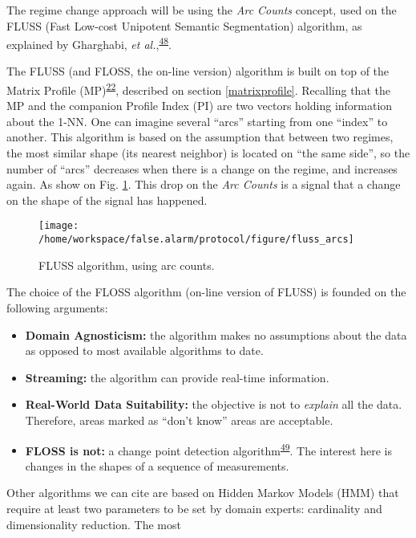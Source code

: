 \documentclass[12pt,twoside]{fmupthesis}
\providecommand{\tightlist}{%
  \setlength{\itemsep}{0pt}\setlength{\parskip}{0pt}}
\begin{document}
The regime change approach will be using the \emph{Arc Counts} concept, used on the FLUSS (Fast Low-cost
Unipotent Semantic Segmentation) algorithm, as explained by Gharghabi, \emph{et al.},\textsuperscript{\protect\hyperlink{ref-gharghabi2018}{48}}.

The FLUSS (and FLOSS, the on-line version) algorithm is built on top of the Matrix Profile
(MP)\textsuperscript{\protect\hyperlink{ref-Yeh2017a}{22}}, described on section \ref{matrixprofile}. Recalling that the MP and the companion
Profile Index (PI) are two vectors holding information about the 1-NN. One can imagine several
``arcs'' starting from one ``index'' to another. This algorithm is based on the assumption that between
two regimes, the most similar shape (its nearest neighbor) is located on ``the same side'', so the
number of ``arcs'' decreases when there is a change on the regime, and increases again. As show on
Fig. \ref{fig:arcsoriginal}. This drop on the \emph{Arc Counts} is a signal that a change on the shape
of the signal has happened.
\begin{figure}

{\centering \texttt{[image: /home/workspace/false.alarm/protocol/figure/fluss\_arcs]} 

}

\caption{FLUSS algorithm, using arc counts.}\label{fig:arcsoriginal}
\end{figure}
The choice of the FLOSS algorithm (on-line version of FLUSS) is founded on the following arguments:
\begin{itemize}
\tightlist
\item
  \textbf{Domain Agnosticism:} the algorithm makes no assumptions about the data as opposed to most
  available algorithms to date.
\item
  \textbf{Streaming:} the algorithm can provide real-time information.
\item
  \textbf{Real-World Data Suitability:} the objective is not to \emph{explain} all the data. Therefore, areas
  marked as ``don't know'' areas are acceptable.
\item
  \textbf{FLOSS is not:} a change point detection algorithm\textsuperscript{\protect\hyperlink{ref-aminikhanghahi2016}{49}}. The interest here is
  changes in the shapes of a sequence of measurements.
\end{itemize}
Other algorithms we can cite are based on Hidden Markov Models (HMM) that require at least two
parameters to be set by domain experts: cardinality and dimensionality reduction. The most
\end{document}
